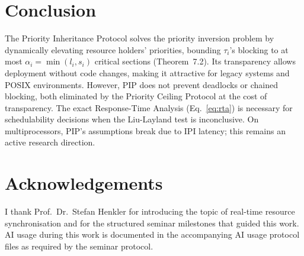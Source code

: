 \documentclass[conference]{IEEEtran}
\begin{document}
\section{Conclusion}
\label{sec:conclusion}

The Priority Inheritance Protocol solves the priority inversion problem
by dynamically elevating resource holders' priorities, bounding
$\tau_i$'s blocking to at most $\alpha_i = \min(l_i, s_i)$ critical
sections (Theorem~7.2).
Its transparency allows deployment without code changes, making it
attractive for legacy systems and POSIX environments.
However, PIP does not prevent deadlocks or chained blocking, both
eliminated by the Priority Ceiling Protocol at the cost of
transparency.
The exact Response-Time Analysis (Eq.~\ref{eq:rta}) is necessary for
schedulability decisions when the Liu-Layland test is inconclusive.
On multiprocessors, PIP's assumptions break due to IPI latency; this
remains an active research direction.

\section*{Acknowledgements}

I thank Prof.\ Dr.\ Stefan Henkler for introducing the topic of
real-time resource synchronisation and for the structured seminar
milestones that guided this work.
AI usage during this work is documented in the accompanying AI usage
protocol files as required by the seminar protocol.



\end{document}
